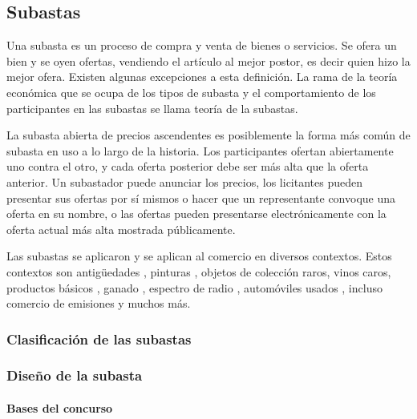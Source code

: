 \documentclass[
]{article}
\begin{document}
\hypertarget{subastas}{%
\subsection{Subastas}\label{subastas}}

Una subasta es un proceso de compra y venta de bienes o servicios. Se
ofera un bien y se oyen ofertas, vendiendo el artículo al mejor postor,
es decir quien hizo la mejor ofera. Existen algunas excepciones a esta
definición. La rama de la teoría económica que se ocupa de los tipos de
subasta y el comportamiento de los participantes en las subastas se
llama teoría de la subastas.

La subasta abierta de precios ascendentes es posiblemente la forma más
común de subasta en uso a lo largo de la historia. Los participantes
ofertan abiertamente uno contra el otro, y cada oferta posterior debe
ser más alta que la oferta anterior. Un subastador puede anunciar los
precios, los licitantes pueden presentar sus ofertas por sí mismos o
hacer que un representante convoque una oferta en su nombre, o las
ofertas pueden presentarse electrónicamente con la oferta actual más
alta mostrada públicamente.

Las subastas se aplicaron y se aplican al comercio en diversos
contextos. Estos contextos son antigüedades , pinturas , objetos de
colección raros, vinos caros, productos básicos , ganado , espectro de
radio , automóviles usados , incluso comercio de emisiones y muchos más.

\hypertarget{clasificaciuxf3n-de-las-subastas}{%
\subsubsection{Clasificación de las
subastas}\label{clasificaciuxf3n-de-las-subastas}}

\hypertarget{diseuxf1o-de-la-subasta}{%
\subsubsection{Diseño de la subasta}\label{diseuxf1o-de-la-subasta}}

\hypertarget{bases-del-concurso}{%
\paragraph{Bases del concurso}\label{bases-del-concurso}}
\end{document}

